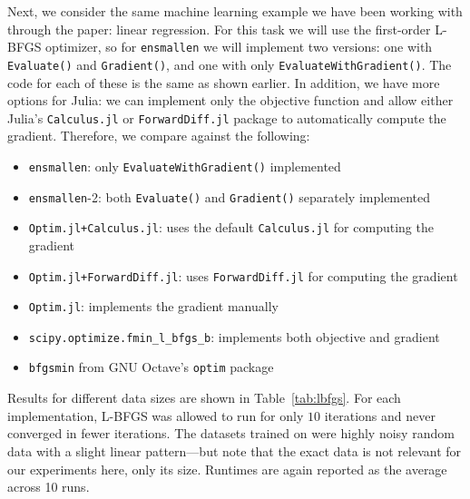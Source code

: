 \documentclass{article}
\begin{document}
Next, we consider the same machine learning example we have been working with
through the paper: linear regression.  For this task we will use the first-order
L-BFGS optimizer, %
so for {\tt ensmallen} we will implement two versions: one with {\tt Evaluate()}
and {\tt Gradient()}, and one with only {\tt EvaluateWithGradient()}.  The code
for each of these is the same as shown earlier.  In addition, we have more
options for Julia: we can implement only the objective function and allow either
Julia's {\tt Calculus.jl} or {\tt ForwardDiff.jl} package to automatically
compute the gradient.  Therefore, we compare against the following:

\begin{itemize}
  \item {\tt ensmallen}: only {\tt EvaluateWithGradient()} implemented
  \item {\tt ensmallen}-2: both {\tt Evaluate()} and {\tt Gradient()} separately
implemented
  \item {\tt Optim.jl+Calculus.jl}: uses the default {\tt Calculus.jl} for
computing the gradient
  \item {\tt Optim.jl+ForwardDiff.jl}: uses {\tt ForwardDiff.jl} for computing
the gradient
  \item {\tt Optim.jl}: implements the gradient manually
  \item {\tt scipy.optimize.fmin\_l\_bfgs\_b}: implements both objective and
gradient
  \item {\tt bfgsmin} from GNU Octave's {\tt optim} package
\end{itemize}

Results for different data sizes are shown in Table~\ref{tab:lbfgs}.  For each
implementation, L-BFGS was allowed to run for only $10$ iterations and never
converged in fewer iterations.  The datasets trained on were highly noisy random
data with a slight linear pattern---but note that the exact data is not relevant
for our experiments here, only its size.  Runtimes are again reported as the
average across 10 runs.
\end{document}
